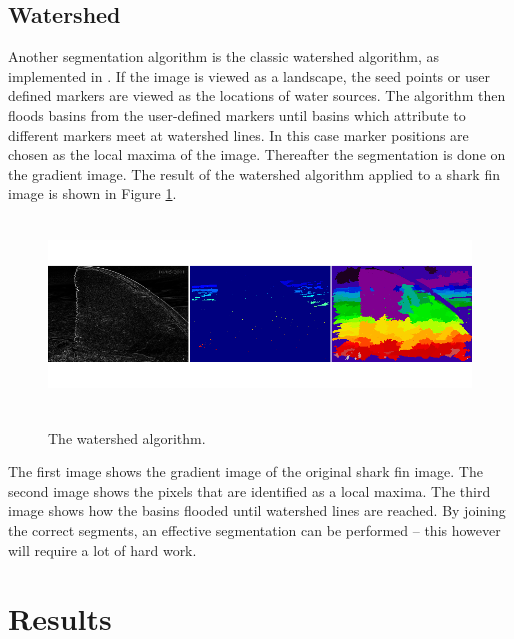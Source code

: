 \documentclass[a4paper,10pt]{article}
\begin{document}
\subsection{Watershed}
\label{watershed}
Another segmentation algorithm is the classic watershed algorithm, as
implemented in \cite{scikit}.  If the image is viewed
  as a landscape, the seed points or user defined markers are viewed as the locations of water sources.  The algorithm then floods
basins from the user-defined markers until basins which attribute to different
markers meet at watershed lines.  In this case marker positions are chosen as
the local maxima of the image.  Thereafter the segmentation is done on the
gradient image.  The result of the watershed algorithm applied to a shark fin
image is shown in Figure \ref{fig3}.

\begin{figure}[H]
\centering
\includegraphics[width=5in,height=2in]{watershed.png} 
\label{fig3}
\caption{The watershed algorithm\cite{scikit}.}
\end{figure}

\noindent The first image shows the gradient image of the original shark fin
image.  The second image shows the pixels that are identified as a local maxima.
 The third image shows how the basins flooded until watershed lines are reached.
 By joining the correct segments, an effective segmentation can be performed -- this however will require
 a lot of hard work.

\newpage
\section{Results}
\subsection{}


\subsection{}
\end{document}
